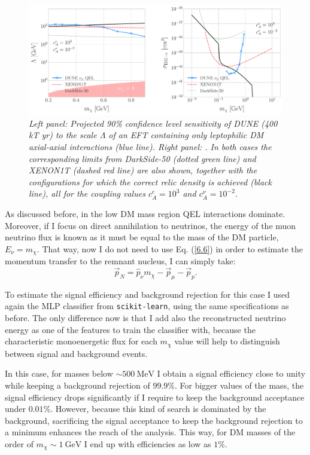 \begin{figure}[t]
	\centering
	\includegraphics[width=1\linewidth]{Images/DM_Analysis/eft_bounds.pdf}
	\caption{\textit{Left panel: Projected 90\% confidence level sensitivity of DUNE (400 kT yr) to the scale $\Lambda$ of an EFT containing only leptophilic DM axial-axial interactions (blue line). Right panel: . In both cases the corresponding limits from DarkSide-50 \cite{DarkSide2018} (dotted green line) and XENON1T \cite{XENON2019} (dashed red line) are also shown, together with the configurations for which the correct relic density is achieved (black line), all for the coupling values $c_{A}^{e} = 10^{3}$ and $c_{A}^{\nu} = 10^{-2}$.}}
	\label{fig:eft_bounds}
\end{figure}

As discussed before, in the low DM mass region QEL interactions dominate. Moreover, if I focus on direct annihilation to neutrinos, the energy of the muon neutrino flux is known as it must be equal to the mass of the DM particle, $E_{\nu} = m_{\chi}$. That way, now I do not need to use Eq. (\ref{6.6}) in order to estimate the momentum transfer to the remnant nucleus, I can simply take:
\begin{equation}\label{7.6}
	\vec{p}_{N} = \hat{p}_{\nu} m_{\chi} - \vec{p}_{\mu} - \vec{p}_{p}.
\end{equation}

To estimate the signal efficiency and background rejection for this case I used again the MLP classifier from \texttt{scikit-learn}, using the same specifications as before. The only difference now is that I add also the reconstructed neutrino energy as one of the features to train the classifier with, because the characteristic monoenergetic flux for each $m_{\chi}$ value will help to distinguish between signal and background events.

In this case, for masses below $\sim 500 \ \mathrm{MeV}$ I obtain a signal efficiency close to unity while keeping a background rejection of $99.9\%$. For bigger values of the mass, the signal efficiency drops significantly if I require to keep the background acceptance under $0.01\%$. However, because this kind of search is dominated by the background, sacrificing the signal acceptance to keep the background rejection to a minimum enhances the reach of the analysis. This way, for DM masses of the order of $m_{\chi} \sim 1 \ \mathrm{GeV}$ I end up with efficiencies as low as $1\%$.

